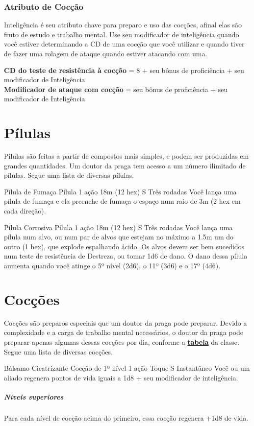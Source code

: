 \documentclass[letterpaper,twocolumn,openany]{dndbook}
\begin{document}
	\subsubsection{Atributo de Cocção}
	Inteligência é seu atributo chave para preparo e uso das cocções, afinal elas são fruto de estudo e trabalho mental. Use seu modificador de inteligência quando você estiver determinando a CD de uma cocção que você utilizar e quando tiver de fazer uma rolagem de ataque quando estiver atacando com uma.
	
	{\footnotesize
	\textbf{CD do teste de resistência à cocção} = 8 + seu bônus de proficiência + seu modificador de Inteligência\\
	\textbf{Modificador de ataque com cocção} = seu bônus de proficiência + seu modificador de Inteligência
	}
	
	\section{Pílulas}
	\label{sec:pilulas}
	Pílulas são feitas a partir de compostos mais simples, e podem ser produzidas em grandes quantidades. Um doutor da praga tem acesso a um número ilimitado de pílulas. Segue uma lista de diversas pílulas.
	
	\spellheader%
	{Pílula de Fumaça}
	{Pílula}
	{1 ação}
	{18m (12 hex)}
	{S}
	{Três rodadas}
	Você lança uma pílula de fumaça e ela preenche de fumaça o espaço num raio de 3m (2 hex em cada direção).
	
	\spellheader%
	{Pílula Corrosiva}
	{Pílula}
	{1 ação}
	{18m (12 hex)}
	{S}
	{Três rodadas}
	Você lança uma pílula num alvo, ou num par de alvos que estejam no máximo a 1.5m um do outro (1 hex), que explode espalhando ácido. Os alvos devem ser bem sucedidos num teste de resistência de Destreza, ou tomar 1d6 de dano. O dano dessa pílula aumenta quando você atinge o 5º nível (2d6), o 11º (3d6) e o 17º (4d6).
	
	\section{Cocções}
	Cocções são preparos especiais que um doutor da praga pode preparar. Devido a complexidade e a carga de trabalho mental necessários, o doutor da praga pode preparar apenas algumas dessas cocções por dia, conforme a \hyperref[tab:doutor_da_praga]{\textbf{tabela}} da classe.
	Segue uma lista de diversas cocções.
	
	\spellheader%
	{Bálsamo Cicatrizante}
	{Cocção de 1º nível}
	{1 ação}
	{Toque}
	{S}
	{Instantâneo}
	Você ou um aliado regenera pontos de vida iguais a 1d8 + seu modificador de inteligência.
	\subparagraph{Níveis superiores} Para cada nível de cocção acima do primeiro, essa cocção regenera +1d8 de vida.
	
\end{document}
